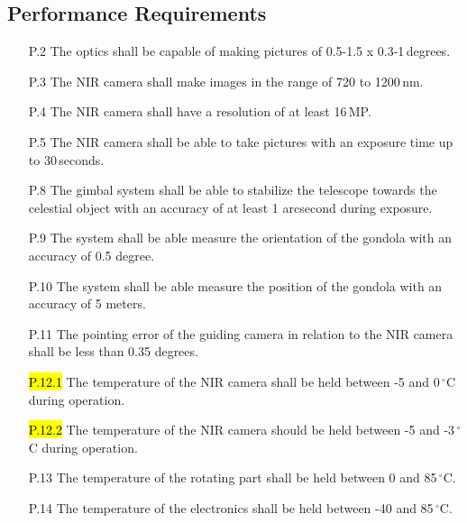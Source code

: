 \subsection{Performance Requirements}

\begin{enumerate}[topsep=0pt,itemsep=-1ex,partopsep=1ex,parsep=1ex]
    \item[P.2] The optics shall be capable of making pictures of 0.5-1.5 x 0.3-1\,degrees.
    \item[P.3] The NIR camera shall make images in the range of 720 to 1200\,nm.
    \item[P.4] The NIR camera shall have a resolution of at least 16\,MP.
    \item[P.5] The NIR camera shall be able to take pictures with an exposure time up to 30\,seconds.
    \item[P.8] The gimbal system shall be able to stabilize the telescope towards the celestial object with an accuracy of at least 1 arcsecond during exposure.
    \item[P.9] The system shall be able measure the orientation of the gondola with an accuracy of 0.5 degree.
	\item[P.10] The system shall be able measure the position of the gondola with an accuracy of 5 meters.
	\item[P.11] The pointing error of the guiding camera in relation to the NIR camera shall be less than 0.35 degrees.
	\item[\hl{P.12.1}]The temperature of the NIR camera shall be held between -5 and 0\,$^\circ$C during operation.
	\item[\hl{P.12.2}] The temperature of the NIR camera should be held between -5 and -3\,$^\circ$C during operation.
	\item[P.13] The temperature of the rotating part shall be held between 0 and 85\,$^\circ$C.
	\item[P.14] The temperature of the electronics shall be held between -40 and 85\,$^\circ$C.
\end{enumerate}
